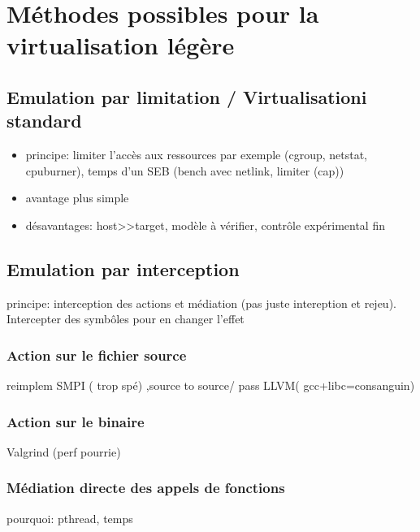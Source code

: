 \section{Méthodes possibles pour la virtualisation légère}
\subsection{Emulation par limitation / Virtualisationi standard}
\begin{itemize}
\item principe: limiter l'accès aux ressources par exemple (cgroup, netstat, cpuburner), temps d'un SEB (bench avec netlink, limiter (cap))
\item avantage plus simple
\item désavantages: host>>target, modèle à vérifier, contrôle expérimental fin
\end{itemize}

\subsection{Emulation par interception}
 principe: interception des actions et médiation (pas juste intereption et rejeu). Intercepter des symbôles pour en changer l'effet

\subsubsection{Action sur le fichier source}
reimplem SMPI ( trop spé) ,source to source/ pass LLVM( gcc+libc=consanguin) 

\subsubsection{Action sur le binaire}
Valgrind (perf pourrie)

\subsubsection{Médiation directe des appels de fonctions}
pourquoi: pthread, temps

